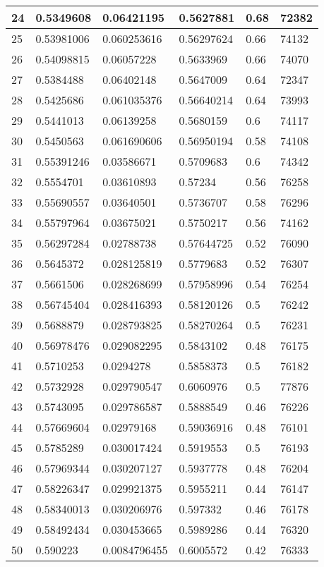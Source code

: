 \begin{longtable}{|l|l|l|l|l|l|}
24 & 0.5349608 & 0.06421195 & 0.5627881 & 0.68 & 72382 \\ \hline 
25 & 0.53981006 & 0.060253616 & 0.56297624 & 0.66 & 74132 \\ \hline 
26 & 0.54098815 & 0.06057228 & 0.5633969 & 0.66 & 74070 \\ \hline 
27 & 0.5384488 & 0.06402148 & 0.5647009 & 0.64 & 72347 \\ \hline 
28 & 0.5425686 & 0.061035376 & 0.56640214 & 0.64 & 73993 \\ \hline 
29 & 0.5441013 & 0.06139258 & 0.5680159 & 0.6 & 74117 \\ \hline 
30 & 0.5450563 & 0.061690606 & 0.56950194 & 0.58 & 74108 \\ \hline 
31 & 0.55391246 & 0.03586671 & 0.5709683 & 0.6 & 74342 \\ \hline 
32 & 0.5554701 & 0.03610893 & 0.57234 & 0.56 & 76258 \\ \hline 
33 & 0.55690557 & 0.03640501 & 0.5736707 & 0.58 & 76296 \\ \hline 
34 & 0.55797964 & 0.03675021 & 0.5750217 & 0.56 & 74162 \\ \hline 
35 & 0.56297284 & 0.02788738 & 0.57644725 & 0.52 & 76090 \\ \hline 
36 & 0.5645372 & 0.028125819 & 0.5779683 & 0.52 & 76307 \\ \hline 
37 & 0.5661506 & 0.028268699 & 0.57958996 & 0.54 & 76254 \\ \hline 
38 & 0.56745404 & 0.028416393 & 0.58120126 & 0.5 & 76242 \\ \hline 
39 & 0.5688879 & 0.028793825 & 0.58270264 & 0.5 & 76231 \\ \hline 
40 & 0.56978476 & 0.029082295 & 0.5843102 & 0.48 & 76175 \\ \hline 
41 & 0.5710253 & 0.0294278 & 0.5858373 & 0.5 & 76182 \\ \hline 
42 & 0.5732928 & 0.029790547 & 0.6060976 & 0.5 & 77876 \\ \hline 
43 & 0.5743095 & 0.029786587 & 0.5888549 & 0.46 & 76226 \\ \hline 
44 & 0.57669604 & 0.02979168 & 0.59036916 & 0.48 & 76101 \\ \hline 
45 & 0.5785289 & 0.030017424 & 0.5919553 & 0.5 & 76193 \\ \hline 
46 & 0.57969344 & 0.030207127 & 0.5937778 & 0.48 & 76204 \\ \hline 
47 & 0.58226347 & 0.029921375 & 0.5955211 & 0.44 & 76147 \\ \hline 
48 & 0.58340013 & 0.030206976 & 0.597332 & 0.46 & 76178 \\ \hline 
49 & 0.58492434 & 0.030453665 & 0.5989286 & 0.44 & 76320 \\ \hline 
50 & 0.590223 & 0.0084796455 & 0.6005572 & 0.42 & 76333 \\ \hline 
\end{longtable}